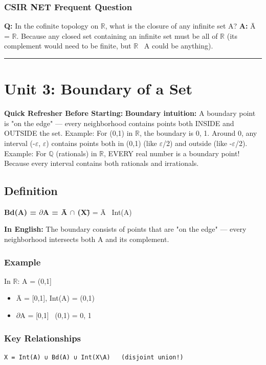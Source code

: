 \documentclass[12pt,a4paper,openany]{book}
\begin{document}
{{\subsubsection{ CSIR NET Frequent Question}
\textbf{Q:} In the cofinite topology on $\mathbb{R}$, what is the closure of any infinite set A?
\textbf{A:} Ā = $\mathbb{R}$. Because any closed set containing an infinite set must be all of $\mathbb{R}$ (its complement would need to be finite, but $\mathbb{R}$ \ A could be anything).

\bigskip\noindent\rule{\textwidth}{0.4pt}\bigskip

\section{Unit 3: Boundary of a Set}

\begin{prereqbox}
 \textbf{Quick Refresher Before Starting:}
\textbf{Boundary intuition:} A boundary point is "on the edge" — every neighborhood contains points both INSIDE and OUTSIDE the set.
Example: For (0,1) in $\mathbb{R}$, the boundary is {0, 1}. Around 0, any interval (-$\varepsilon$, $\varepsilon$) contains points both in (0,1) (like $\varepsilon$/2) and outside (like -$\varepsilon$/2).
Example: For $\mathbb{Q}$ (rationals) in $\mathbb{R}$, EVERY real number is a boundary point! Because every interval contains both rationals and irrationals.
\end{prereqbox}


\subsection{Definition}
\textbf{Bd(A) = $\partial$A = Ā $\cap$ (X\A)̄} = Ā \ Int(A)

\textbf{In English:} The boundary consists of points that are "on the edge" — every neighborhood intersects both A and its complement.

\subsubsection{Example}
In $\mathbb{R}$: A = (0,1]
\begin{itemize}[leftmargin=*]
  \item Ā = [0,1], Int(A) = (0,1)
  \item $\partial$A = [0,1] \ (0,1) = {0, 1}
\end{itemize}

\subsubsection{Key Relationships}
\begin{verbatim}
X = Int(A) ∪ Bd(A) ∪ Int(X\A)   (disjoint union!)


\end{verbatim}}}
\end{document}
